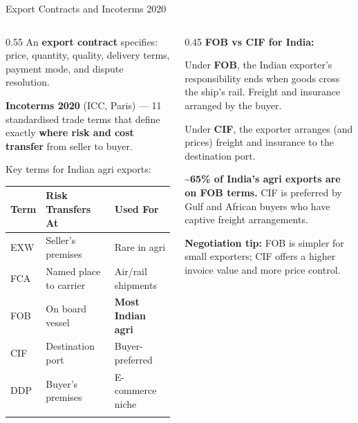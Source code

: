 \documentclass[
  ignorenonframetext,
  aspectratio=169,
]{beamer}
\makeatletter
\let\quarto@originallabel\label
\DeclareRobustCommand*{\label}[1]{\quarto@originallabel{#1}}
\makeatother
\begin{document}
\begin{frame}
\begin{block}{Export Contracts and Incoterms 2020}
\label{export-contracts-and-incoterms-2020}
\begin{columns}[T]
\begin{column}{0.55\linewidth}
An \textbf{export contract} specifies: price, quantity, quality,
delivery terms, payment mode, and dispute resolution.

\textbf{Incoterms 2020} (ICC, Paris) --- 11 standardised trade terms
that define exactly \textbf{where risk and cost transfer} from seller to
buyer.

Key terms for Indian agri exports:

\begin{longtable}[]{@{}lll@{}}
\toprule\noalign{}
Term & Risk Transfers At & Used For \\
\midrule\noalign{}
\endhead
{EXW} & Seller's premises & Rare in agri \\
{FCA} & Named place to carrier & Air/rail shipments \\
{FOB} & On board vessel & \textbf{Most Indian agri} \\
{CIF} & Destination port & Buyer-preferred \\
{DDP} & Buyer's premises & E-commerce niche \\
\bottomrule\noalign{}
\end{longtable}
\end{column}

\begin{column}{0.45\linewidth}
\textbf{FOB vs CIF for India:}

Under \textbf{FOB}, the Indian exporter's responsibility ends when goods
cross the ship's rail. Freight and insurance arranged by the buyer.

Under \textbf{CIF}, the exporter arranges (and prices) freight and
insurance to the destination port.

\textbf{\textasciitilde65\% of India's agri exports are on FOB terms.}
CIF is preferred by Gulf and African buyers who have captive freight
arrangements.

\textbf{Negotiation tip:} FOB is simpler for small exporters; CIF offers
a higher invoice value and more price control.
\end{column}
\end{columns}
\end{block}
\end{frame}
\end{document}
